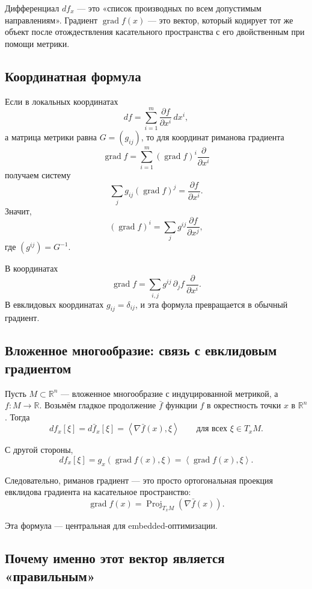 \documentclass[12pt,a4paper]{article}
\theoremstyle{rudef}
\theoremstyle{ruplain}
\newcommand{\R}{\mathbb{R}}
\newcommand{\grad}{\operatorname{grad}}
\newcommand{\Proj}{\operatorname{Proj}}
\newcommand{\ip}[2]{\left\langle #1,#2\right\rangle}
\newcommand{\parent}[1]{\left(#1\right)}
\begin{document}
\begin{ideabox}
Дифференциал $df_x$ --- это «список производных по всем допустимым направлениям». Градиент $\grad f(x)$ --- это вектор, который кодирует тот же объект после отождествления касательного пространства с его двойственным при помощи метрики.
\end{ideabox}

\subsection{Координатная формула}

Если в локальных координатах
\[
df = \sum_{i=1}^m \frac{\partial f}{\partial x^i}\,dx^i,
\]
а матрица метрики равна $G=(g_{ij})$, то для координат риманова градиента
\[
\grad f = \sum_{i=1}^m (\grad f)^i \frac{\partial}{\partial x^i}
\]
получаем систему
\[
\sum_j g_{ij}(\grad f)^j = \frac{\partial f}{\partial x^i}.
\]
Значит,
\[
(\grad f)^i = \sum_j g^{ij}\frac{\partial f}{\partial x^j},
\]
где $(g^{ij})=G^{-1}$.

\begin{formulaibox}
В координатах
\[
\boxed{\ \grad f = \sum_{i,j} g^{ij}\,\partial_j f\,\frac{\partial}{\partial x^i}.\ }
\]
В евклидовых координатах $g_{ij}=\delta_{ij}$, и эта формула превращается в обычный градиент.
\end{formulaibox}

\subsection{Вложенное многообразие: связь с евклидовым градиентом}

Пусть $M\subset \R^n$ --- вложенное многообразие с индуцированной метрикой, а $f:M\to \R$. Возьмём гладкое продолжение $\bar f$ функции $f$ в окрестность точки $x$ в $\R^n$. Тогда
\[
df_x[\xi]=d\bar f_x[\xi]=\ip{\nabla \bar f(x)}{\xi}
\qquad \text{для всех } \xi\in T_xM.
\]

С другой стороны,
\[
df_x[\xi]=g_x(\grad f(x),\xi)=\ip{\grad f(x)}{\xi}.
\]

Следовательно, риманов градиент --- это просто ортогональная проекция евклидова градиента на касательное пространство:
\[
\boxed{\ \grad f(x)=\Proj_{T_xM}\parent{\nabla \bar f(x)}.\ }
\]

Эта формула --- центральная для embedded-оптимизации.

\subsection{Почему именно этот вектор является «правильным»}
\end{document}
